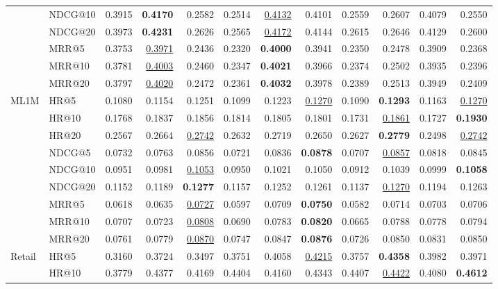 \begin{tabular}{llrrrrrrrrrr}
 & NDCG@10 & 0.3915 & \textbf{0.4170} & 0.2582 & 0.2514 & \underline{0.4132} & 0.4101 & 0.2559 & 0.2607 & 0.4079 & 0.2550 \\
 & NDCG@20 & 0.3973 & \textbf{0.4231} & 0.2626 & 0.2565 & \underline{0.4172} & 0.4144 & 0.2615 & 0.2646 & 0.4129 & 0.2600 \\
 & MRR@5 & 0.3753 & \underline{0.3971} & 0.2436 & 0.2320 & \textbf{0.4000} & 0.3941 & 0.2350 & 0.2478 & 0.3909 & 0.2368 \\
 & MRR@10 & 0.3781 & \underline{0.4003} & 0.2460 & 0.2347 & \textbf{0.4021} & 0.3966 & 0.2374 & 0.2502 & 0.3935 & 0.2396 \\
 & MRR@20 & 0.3797 & \underline{0.4020} & 0.2472 & 0.2361 & \textbf{0.4032} & 0.3978 & 0.2389 & 0.2513 & 0.3949 & 0.2409 \\
\hline
ML1M & HR@5 & 0.1080 & 0.1154 & 0.1251 & 0.1099 & 0.1223 & \underline{0.1270} & 0.1090 & \textbf{0.1293} & 0.1163 & \underline{0.1270} \\
 & HR@10 & 0.1768 & 0.1837 & 0.1856 & 0.1814 & 0.1805 & 0.1801 & 0.1731 & \underline{0.1861} & 0.1727 & \textbf{0.1930} \\
 & HR@20 & 0.2567 & 0.2664 & \underline{0.2742} & 0.2632 & 0.2719 & 0.2650 & 0.2627 & \textbf{0.2779} & 0.2498 & \underline{0.2742} \\
 & NDCG@5 & 0.0732 & 0.0763 & 0.0856 & 0.0721 & 0.0836 & \textbf{0.0878} & 0.0707 & \underline{0.0857} & 0.0818 & 0.0845 \\
 & NDCG@10 & 0.0951 & 0.0981 & \underline{0.1053} & 0.0950 & 0.1021 & 0.1050 & 0.0912 & 0.1039 & 0.0999 & \textbf{0.1058} \\
 & NDCG@20 & 0.1152 & 0.1189 & \textbf{0.1277} & 0.1157 & 0.1252 & 0.1261 & 0.1137 & \underline{0.1270} & 0.1194 & 0.1263 \\
 & MRR@5 & 0.0618 & 0.0635 & \underline{0.0727} & 0.0597 & 0.0709 & \textbf{0.0750} & 0.0582 & 0.0714 & 0.0703 & 0.0706 \\
 & MRR@10 & 0.0707 & 0.0723 & \underline{0.0808} & 0.0690 & 0.0783 & \textbf{0.0820} & 0.0665 & 0.0788 & 0.0778 & 0.0794 \\
 & MRR@20 & 0.0761 & 0.0779 & \underline{0.0870} & 0.0747 & 0.0847 & \textbf{0.0876} & 0.0726 & 0.0850 & 0.0831 & 0.0850 \\
\hline
Retail & HR@5 & 0.3160 & 0.3724 & 0.3497 & 0.3751 & 0.4058 & \underline{0.4215} & 0.3757 & \textbf{0.4358} & 0.3982 & 0.3971 \\
 & HR@10 & 0.3779 & 0.4377 & 0.4169 & 0.4404 & 0.4160 & 0.4343 & 0.4407 & \underline{0.4422} & 0.4080 & \textbf{0.4612} \\

\end{tabular}
